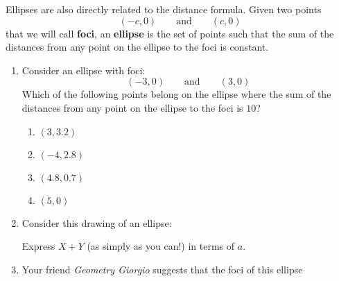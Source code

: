 \documentclass[nooutcomes,noauthor,handout,12pt]{ximera}
\begin{document}
\begin{question}
  Ellipses are also directly related to the distance formula.  Given
  two points
  \[
  (-c,0) \qquad\text{and} \qquad (c,0)
  \]
  that we will call \textbf{foci}, an \textbf{ellipse} is the set
  of points such that the sum of the distances from any point on
  the ellipse to the foci is constant.
  \begin{enumerate}      
  \item Consider an ellipse with foci:
    \[
    (-3,0) \qquad \text{and}\qquad (3,0)
    \]%
    Which of the following points belong on the ellipse where the sum
    of the distances from any point on the ellipse to the foci is
    $10$?
    \begin{enumerate}
    \item $(3,3.2)$ %
    \item $(-4,2.8)$ %
    \item $(4.8,0.7)$ %
    \item $(5,0)$ %
    \end{enumerate}
    \item Consider this drawing of an ellipse:
      \begin{center}
      \end{center}
      Express $X+Y$ (as simply as you can!) in terms of $a$.

      \break
      
    \item Your friend \textit{Geometry Giorgio} suggests that the foci of this ellipse
      \begin{center}
\end{center}
\end{enumerate}
\end{question}
\end{document}
